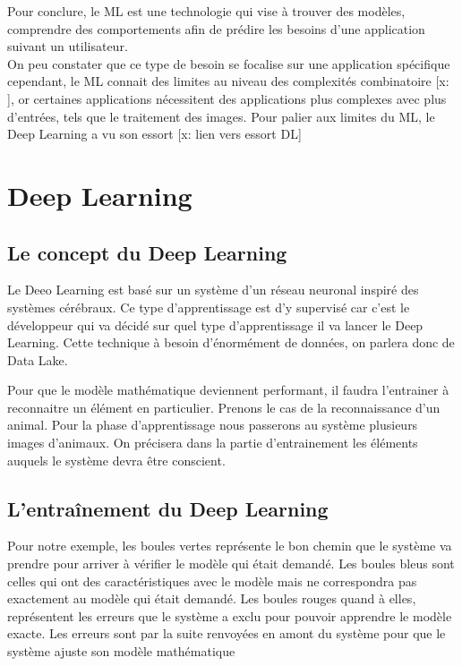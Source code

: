 \documentclass[12pt,a4paper]{report}
\begin{document}
Pour conclure, le ML est une technologie qui vise à trouver des modèles, comprendre des comportements afin de prédire les besoins d'une application suivant un utilisateur.\\

On peu constater que ce type de besoin se focalise sur une application spécifique cependant, le ML connait des limites au niveau des complexités combinatoire [x: ], or certaines applications nécessitent des applications plus complexes avec plus d'entrées, tels que le traitement des images. Pour palier aux limites du ML, le Deep Learning a vu son essort [x: lien vers essort DL]
\pagebreak



\chapter{Deep Learning}
\section{Le concept du Deep Learning}

Le Deeo Learning est basé sur un système d'un réseau neuronal inspiré des systèmes cérébraux. Ce type d'apprentissage est d'y supervisé car c'est le développeur qui va décidé sur quel type d'apprentissage il va lancer le Deep Learning. Cette technique à besoin d'énormément de données, on parlera donc de Data Lake. 

Pour que le modèle mathématique deviennent performant, il faudra l'entrainer à reconnaitre un élément en particulier. Prenons le cas de la reconnaissance d'un animal. Pour la phase d'apprentissage nous passerons au système plusieurs images d'animaux. On précisera dans la partie d'entrainement les éléments auquels le système devra être conscient.


\pagebreak

\section{L'entraînement du Deep Learning}

Pour notre exemple, les boules vertes représente le bon chemin que le système va prendre pour arriver à vérifier le modèle qui était demandé. Les boules bleus sont celles qui ont des caractéristiques avec le modèle mais ne correspondra pas exactement au modèle qui était demandé. Les boules rouges quand à elles, représentent les erreurs que le système a exclu pour pouvoir apprendre le modèle exacte. Les erreurs sont par la suite renvoyées en amont du système pour que le système ajuste son modèle mathématique
\end{document}

